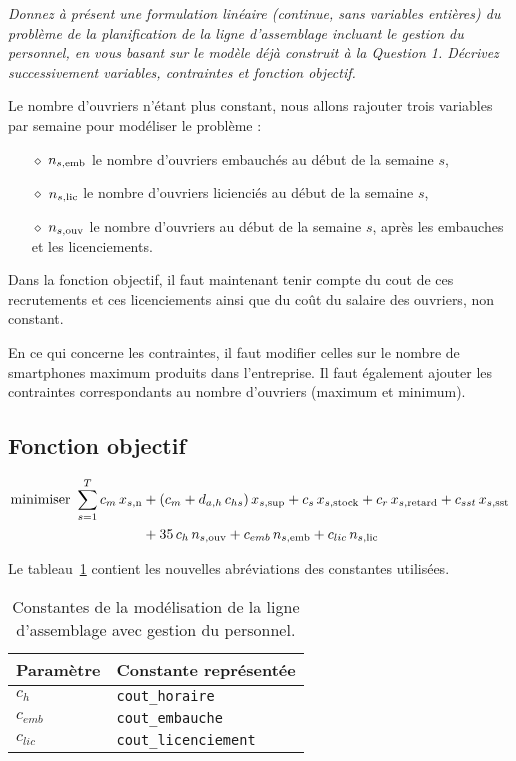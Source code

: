 \question %
\emph{Donnez à présent une formulation linéaire (continue, sans variables
entières) du problème de la planification de la ligne d'assemblage
incluant le gestion du personnel, en vous basant sur le modèle déjà
construit à la Question 1. Décrivez successivement variables,
contraintes et fonction objectif.}

Le nombre d'ouvriers n'étant plus constant, nous allons rajouter trois variables
par semaine pour modéliser le problème :
\begin{itemize}
  \item[$\diamond$] $n_{s,\text{emb}}$ le nombre d'ouvriers embauchés au début de la semaine $s$,
  \item[$\diamond$] $n_{s,\text{lic}}$ le nombre d'ouvriers licienciés au début de la semaine $s$,
  \item[$\diamond$] $n_{s,\text{ouv}}$ le nombre d'ouvriers au début de la semaine $s$,
  après les embauches et les licenciements.
\end{itemize}

Dans la fonction objectif, il faut maintenant tenir compte du cout de
ces recrutements et ces licenciements
ainsi que du coût du salaire des ouvriers, non constant.

En ce qui concerne les contraintes, il faut modifier celles sur
le nombre de smartphones maximum produits dans l'entreprise.
Il faut également ajouter les contraintes correspondants
au nombre d'ouvriers (maximum et minimum).

\subsection*{Fonction objectif}
\begin{align*}
  \mbox{minimiser }
  \sum_{s=1}^{T}
  c_m\, x_{s,\text{n}} &+ (c_m + d_{a,h} \, c_{hs})\, x_{s,\text{sup}}
  + c_s\, x_{s,\text{stock}} + c_r\, x_{s,\text{retard}} + c_{sst}\, x_{s,\text{sst}} \\
  &+ 35 \, c_{h} \, n_{s,\text{ouv}}
  + c_{emb} \, n_{s,\text{emb}} + c_{lic} \, n_{s,\text{lic}}
\end{align*}

Le tableau~\ref{tab:constantesQuestion7} contient les nouvelles abréviations
des constantes utilisées.
\begin{table}[h]
  \begin{center}
  \begin{tabular}{|l|l|}
    \hline
    Paramètre & Constante représentée \\
    \hline
    \hline
    $c_{h}$ & \texttt{cout\_horaire} \\
    \hline
    $c_{emb}$ & \texttt{cout\_embauche} \\
    \hline
    $c_{lic}$ & \texttt{cout\_licenciement} \\
    \hline
  \end{tabular}
  \caption{Constantes de la modélisation de la ligne d'assemblage
  avec gestion du personnel.}
  \label{tab:constantesQuestion7}
  \end{center}
\end{table}

